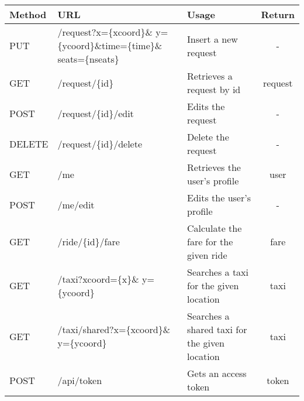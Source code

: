 \begin{myfontAPI}
{\renewcommand{\arraystretch}{1.7}
\begin{tabularx}{\textwidth}{| l | X | X | c |}
\hline 
\textbf{Method} &  \textbf{URL}   & \textbf{Usage} & \textbf{Return}\\ 
\hline 

PUT      & /request?x=\{xcoord\}\& y=\{ycoord\}\&time=\{time\}\& seats=\{nseats\}       & Insert a new request       &  -\\
\hline 
GET      & /request/\{id\}   &  Retrieves a request by id &  request \\
\hline 
POST     & /request/\{id\}/edit  &  Edits the request    &  -\\
\hline 
DELETE   & /request/\{id\}/delete   &  Delete the request    &  -\\
\hline 
GET      & /me             &  Retrieves the user's profile   & user\\
\hline 
POST     & /me/edit             &  Edits the user's profile   & -\\
\hline 
GET      & /ride/\{id\}/fare &  Calculate the fare for the given ride   &  fare\\
\hline 
GET      &       /taxi?xcoord=\{x\}\& y=\{ycoord\}  &  Searches a taxi for the given location   &  taxi\\
\hline 
GET      &       /taxi/shared?x=\{xcoord\}\& y=\{ycoord\}  &  Searches a shared taxi for the given location   &  taxi\\
\hline
POST     & /api/token      &  Gets an access token      & token \\
\hline


\end{tabularx}}

\end{myfontAPI} 



